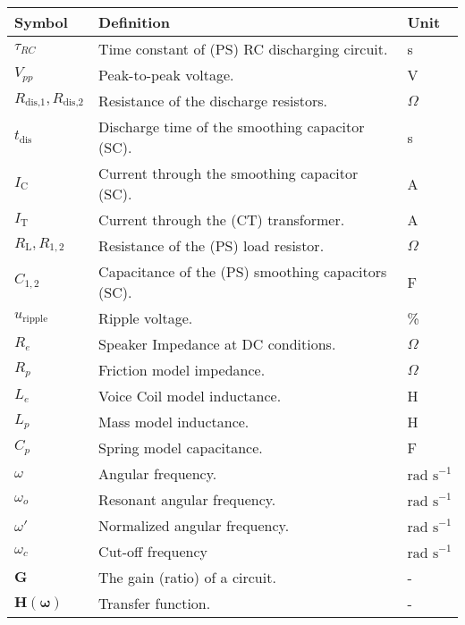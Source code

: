 \begin{longtable}{>{\centering\arraybackslash}p{2.5cm} >{\centering\arraybackslash}p{8cm} >{\centering\arraybackslash}p{2.5cm}}
    \toprule
    Symbol & Definition & Unit \\ %
    \midrule\endhead
    $\tau_{RC}$ & Time constant of (PS) RC discharging circuit. & s \\
    $V_{pp}$ & Peak-to-peak voltage. & V \\
    $R_{\text{dis,1}},R_{\text{dis,2}}$ & Resistance of the discharge resistors. & $\Omega$ \\
    $t_{\text{dis}}$ & Discharge time of the smoothing capacitor (SC). & s \\
    
    $I_{\text{C}}$ & Current through the smoothing capacitor (SC). & A \\
    $I_{\text{T}}$ & Current through the (CT) transformer. & A \\

    $R_\text{L},R_{1,2}$ & Resistance of the (PS) load resistor. & $\Omega$\\
    $C_{1,2}$ & Capacitance of the (PS) smoothing capacitors (SC). & F \\
    $u_{\text{ripple}}$ & Ripple voltage. & \% \\
    
    $R_{e}$ & Speaker Impedance at DC conditions. & $\Omega$ \\
    $R_p$ & Friction model impedance. & $\Omega$ \\
    $L_e$ & Voice Coil model inductance. & H \\
    $L_p$ & Mass model inductance. & H \\
    $C_p$ & Spring model capacitance. & F \\
    $\omega$ & Angular frequency. & $\text{rad s}^{-1}$ \\
    $\omega_o$ & Resonant angular frequency. & $\text{rad s}^{-1}$ \\
    $\omega'$ & Normalized angular frequency. & $\text{rad s}^{-1}$ \\
    $\omega_c$ & Cut-off frequency &  $\text{rad s}^{-1}$ \\
    $\mathbf{G}$ & The gain (ratio) of a circuit. & - \\
    $\mathbf{H(\omega)}$ & Transfer function. & - \\
    \bottomrule
\end{longtable}


